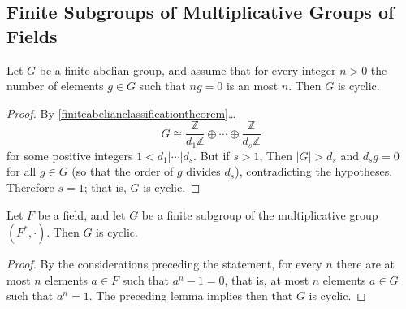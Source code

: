 \subsection{Finite Subgroups of Multiplicative Groups of Fields}\label{subgroupsofmultgrpinfld}

\begin{lemma}
Let $G$ be a finite abelian group, and assume that for every integer $n > 0$ the number of elements $g \in G$ such that $ng = 0$ is an most $n$. Then $G$ is cyclic.
\end{lemma}

\begin{proof}
By \ref{finiteabelianclassificationtheorem}\dots
$$G \cong \frac{\mathbb{Z}}{d_1\mathbb{Z}}\oplus \cdots \oplus \frac{\mathbb{Z}}{d_s\mathbb{Z}}$$
for some positive integers $1 < d_1 | \cdots | d_s$. But if $s > 1$, Then $|G| > d_s$ and $d_sg = 0$ for all $g \in G$ (so that the order of $g$ divides $d_s$), contradicting the hypotheses. Therefore $s = 1$; that is, $G$ is cyclic.
\end{proof}

\begin{proposition}
Let $F$ be a field, and let $G$ be a finite subgroup of the multiplicative group $(F^*, \cdot)$. Then $G$ is cyclic.
\end{proposition}

\begin{proof}
By the considerations preceding the statement, for every $n$ there are at most $n$ elements $a \in F$ such that $a^n - 1 = 0$, that is, at most $n$ elements $a \in G$ such that $a^n = 1$.
The preceding lemma implies then that $G$ is cyclic.
\end{proof}